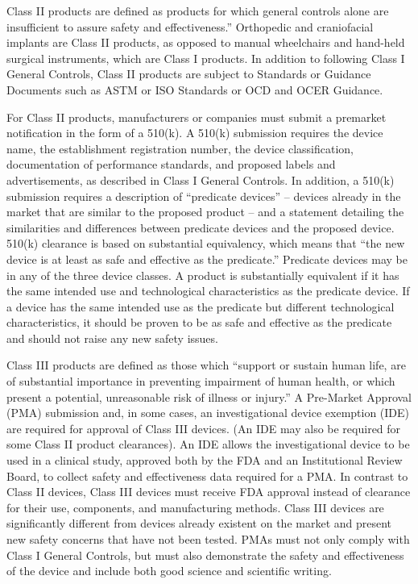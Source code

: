 \documentclass{article}
\begin{document}
Class II products are defined as products for which general controls
alone are insufficient to assure safety and effectiveness.” Orthopedic
and craniofacial implants are Class II products, as opposed to manual
wheelchairs and hand-held surgical instruments, which are Class I
products.  In addition to following Class I General Controls, Class II
products are subject to Standards or Guidance Documents such as ASTM
or ISO Standards or OCD and OCER Guidance.

For Class II products, manufacturers or companies must submit a
premarket notification in the form of a 510(k). A 510(k) submission
requires the device name, the establishment registration number, the
device classification, documentation of performance standards, and
proposed labels and advertisements, as described in Class I General
Controls. In addition, a 510(k) submission requires a description of
“predicate devices” – devices already in the market that are similar
to the proposed product – and a statement detailing the similarities
and differences between predicate devices and the proposed
device. 510(k) clearance is based on substantial equivalency, which
means that “the new device is at least as safe and effective as the
predicate.” Predicate devices may be in any of the three device
classes. A product is substantially equivalent if it has the same
intended use and technological characteristics as the predicate
device. If a device has the same intended use as the predicate but
different technological characteristics, it should be proven to be as
safe and effective as the predicate and should not raise any new
safety issues.

Class III products are defined as those which “support or sustain
human life, are of substantial importance in preventing impairment of
human health, or which present a potential, unreasonable risk of
illness or injury.” A Pre-Market Approval (PMA) submission and, in
some cases, an investigational device exemption (IDE) are required for
approval of Class III devices. (An IDE may also be required for some
Class II product clearances). An IDE allows the investigational device
to be used in a clinical study, approved both by the FDA and an
Institutional Review Board, to collect safety and effectiveness data
required for a PMA.  In contrast to Class II devices, Class III
devices must receive FDA approval instead of clearance for their use,
components, and manufacturing methods. Class III devices are
significantly different from devices already existent on the market
and present new safety concerns that have not been tested. PMAs must
not only comply with Class I General Controls, but must also
demonstrate the safety and effectiveness of the device and include
both good science and scientific writing.
	 
\end{document}
